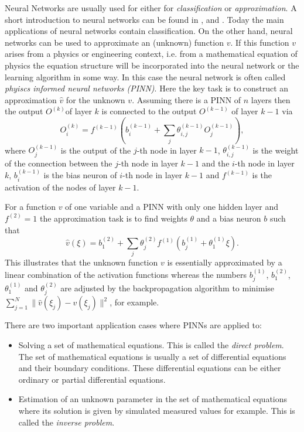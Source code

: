 \documentclass[a4paper,11pt]{article}
\begin{document}
Neural Networks are usually used for either for \emph{classification} or \emph{approximation}. A short introduction to neural networks can be found in \cite[pp. 809]{stoecker1995formeln}, \cite{rey2011neuralnetworks} and \cite{rojas1993neuronale}. Today the main applications of neural networks contain classification. On the other hand, neural networks can be used to approximate an (unknown) function $v$. If this function $v$ arises from a physics or engineering context, i.e. from a mathematical equation of  physics the equation structure will be incorporated into the neural network or the learning algorithm in some way. In this case the neural network is often called \emph{phyiscs informed neural networks (PINN)}. Here the key task is to construct an approximation $ \hat{v} $ for the unknown $v$. Assuming there is a PINN of $n$ layers then the output $O^{(k)} $of layer $k$ is connected to the output $O^{(k-1)} $ of layer $k-1$ via
\begin{equation*}
O^{(k)}_i = f^{(k-1)}\left( b^{(k-1)}_i + \sum_j \theta^{(k-1)}_{i,j} O^{(k-1)}_j \right),
\end{equation*}
where $ O^{(k-1)}_j $ is  the output of the $j$-th node in layer $k-1$, $ \theta^{(k-1)}_{i,j} $ is the weight of the connection between  the $j$-th node in layer $k-1$ and the $i$-th node in layer $k$, $ b^{(k-1)}_i $ is the bias neuron of $i$-th node in layer $k-1$ and $f^{(k-1)}$ is the activation of the nodes of layer $k-1$.

For a function $v$ of one variable and a PINN with only one hidden layer and $f^{(2)} = 1 $ the approximation task is to find weights $\theta $ and a bias neuron $b$ such that
\begin{equation*}
\hat{v} (\xi) =   b_1^{(2)} + \sum_j \theta^{(2)}_j f^{(1)}\left( b_j^{(1)} + \theta_1^{(1)} \xi \right).
\end{equation*}
This illustrates that the unknown function $v$ is essentially approximated by a linear combination of the activation functions whereas the numbers $b_j^{(1)}$, $ b_1^{(2)} $, $ \theta_1^{(1)} $ and $ \theta^{(2)}_j $ are adjusted by the backpropagation algorithm to minimise $ \sum_{j=1}^N\| \hat{v} (\xi_j) - v(\xi_j) \|^2 $, for example.

There are two important application cases where PINNs are applied to:
\begin{itemize}
\item Solving a set of mathematical equations. This is called the \emph{direct problem}. The set of mathematical equations is usually a set of differential equations and their boundary conditions. These differential equations can be either ordinary or partial differential equations.
\item Estimation of an unknown parameter in the set of mathematical equations where its solution is given by simulated measured values for example. This is called the \emph{inverse problem}.
\end{itemize}
\end{document}
